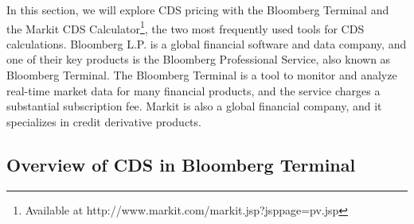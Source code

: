 \documentclass{jss}
\begin{document}
In this section, we will explore CDS pricing with the Bloomberg Terminal and the Markit CDS Calculator\footnote{Available at http://www.markit.com/markit.jsp?jsppage=pv.jsp}, the two most frequently used tools for CDS calculations. Bloomberg L.P. is a global financial software and data company, and one of their key products is the Bloomberg Professional Service, also known as Bloomberg Terminal. The Bloomberg Terminal is a tool to monitor and analyze real-time market data for many financial products, and the service charges a substantial subscription fee. Markit is also a global financial company, and it specializes in credit derivative products. 

\subsection{Overview  of CDS in Bloomberg Terminal}
\label{subsec:Bloomberg}



\end{document}
